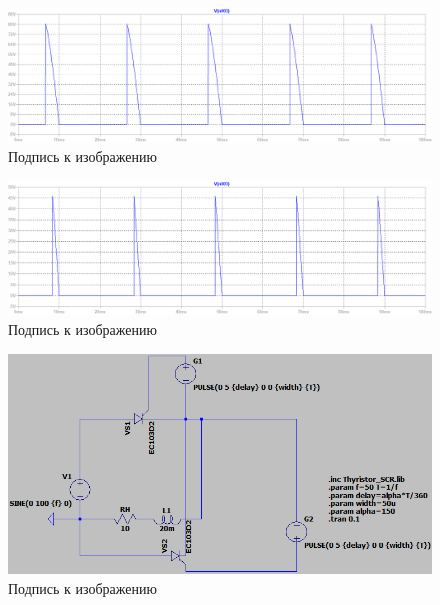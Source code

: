 \documentclass[a4paper, 12pt]{article}
\begin{document}
    \begin{figure}[H]
        \centering
        \includegraphics[scale=0.45]{a120.png}
        \captionsetup{skip=0pt}
        \caption{Подпись к изображению}
        \label{fig:a120}
    \end{figure}
    \begin{figure}[H]
        \centering
        \includegraphics[scale=0.45]{a150.png}
        \captionsetup{skip=0pt}
        \caption{Подпись к изображению}
        \label{fig:a150}
    \end{figure}


    \begin{figure}[H]
        \centering
        \includegraphics[scale=0.7]{scheme2.png}
        \captionsetup{skip=0pt}
        \caption{Подпись к изображению}
        \label{fig:scheme2}
    \end{figure}
\end{document}
